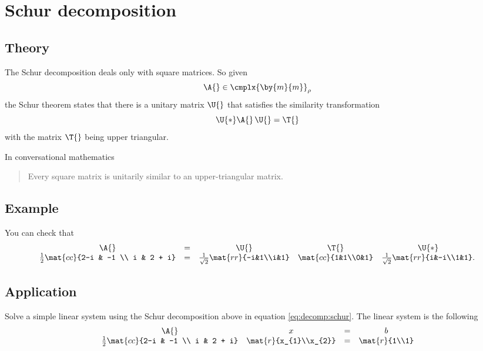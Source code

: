 \section{Schur decomposition}

\subsection{Theory}
The Schur decomposition deals only with square matrices. So given 
\begin{equation}
  \A{}\in\cmplx{\by{m}{m}}_{\rho}
\end{equation}
the Schur theorem states that there is a unitary matrix $\U{}$ that satisfies the similarity transformation
\begin{equation}
  \U{*}\A{}\,\U{} = \T{}
\end{equation}
with the matrix $\T{}$ being upper triangular.

In conversational mathematics
\begin{quote}
  Every square matrix is unitarily similar to an upper-triangular matrix.
\end{quote}

\subsection{Example}
You can check that
\begin{equation}
  \begin{array}{ccccc}
    \A{}&=&\U{}&\T{}&\U{*}\\
    \frac{1}{2}\mat{cc}{2-i & -1 \\ i & 2 + i}&=&
    \frac{1}{\sqrt{2}}\mat{rr}{-i&1\\i&1}&
                      \mat{cc}{1&1\\0&1}&
    \frac{1}{\sqrt{2}}\mat{rr}{i&-i\\1&1}.
  \end{array}
  \label{eq:decomp:schur}
\end{equation}

\subsection{Application}
Solve a simple linear system using the Schur decomposition above in equation \eqref{eq:decomp:schur}. The linear system is the following
\begin{equation}
  \begin{array}{cccc}
    \A{}&x&=&b\\
    \frac{1}{2}\mat{cc}{2-i & -1 \\ i & 2 + i}&\mat{r}{x_{1}\\x_{2}}&
    =&\mat{r}{1\\1}
  \end{array}
  \label{eq:schur:app}
\end{equation}

